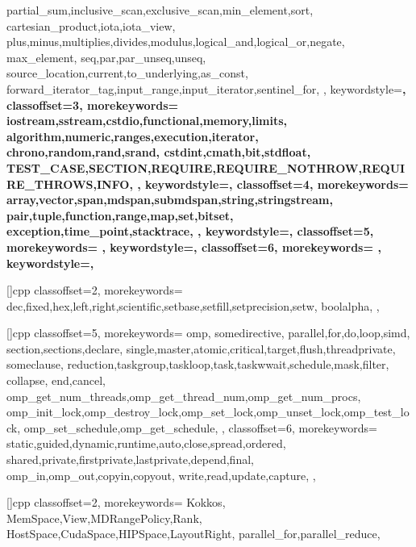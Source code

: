 {{    partial_sum,inclusive_scan,exclusive_scan,min_element,sort,
    cartesian_product,iota,iota_view,
    plus,minus,multiplies,divides,modulus,logical_and,logical_or,negate,
    max_element,
    seq,par,par_unseq,unseq,
    source_location,current,to_underlying,as_const,
    forward_iterator_tag,input_range,input_iterator,sentinel_for,
  },
  keywordstyle=\bfseries\color{jade},
  classoffset=3,
  morekeywords={
    iostream,sstream,cstdio,functional,memory,limits,
    algorithm,numeric,ranges,execution,iterator,
    chrono,random,rand,srand,
    cstdint,cmath,bit,stdfloat,
    TEST_CASE,SECTION,REQUIRE,REQUIRE_NOTHROW,REQUIRE_THROWS,INFO,
  },
  keywordstyle=\bfseries\color{green!40!blue!60},
  classoffset=4,
  morekeywords={
    array,vector,span,mdspan,submdspan,string,stringstream,
    pair,tuple,function,range,map,set,bitset,
    exception,time_point,stacktrace,
  },
  keywordstyle=\bfseries\color{lavender(floral)},
  classoffset=5,
  morekeywords={
  },
  keywordstyle=\bfseries\color{green!40!red!60},
  classoffset=6,
  morekeywords={
  },
  keywordstyle=\bfseries\color{green!70!red!30},
}
\newcommand\lstcstd[1]{\lstinline{std::#1}}

[]{cpp}{
  classoffset=2,
  morekeywords={
    dec,fixed,hex,left,right,scientific,setbase,setfill,setprecision,setw,
    boolalpha,
  },
}

[]{cpp}{
  classoffset=5,
  morekeywords={
    omp,
    somedirective,
    parallel,for,do,loop,simd,
    section,sections,declare,
    single,master,atomic,critical,target,flush,threadprivate,
    someclause,
    reduction,taskgroup,taskloop,task,taskwwait,schedule,mask,filter,
    collapse,
    end,cancel,
    omp_get_num_threads,omp_get_thread_num,omp_get_num_procs,
    omp_init_lock,omp_destroy_lock,omp_set_lock,omp_unset_lock,omp_test_lock,
    omp_set_schedule,omp_get_schedule,
  },
  classoffset=6,
  morekeywords={
    static,guided,dynamic,runtime,auto,close,spread,ordered,
    shared,private,firstprivate,lastprivate,depend,final,
    omp_in,omp_out,copyin,copyout,
    write,read,update,capture,
  },
}

[]{cpp}{
  classoffset=2,
  morekeywords={
    Kokkos,
    MemSpace,View,MDRangePolicy,Rank,
    HostSpace,CudaSpace,HIPSpace,LayoutRight,
    parallel_for,parallel_reduce,
  }
}

